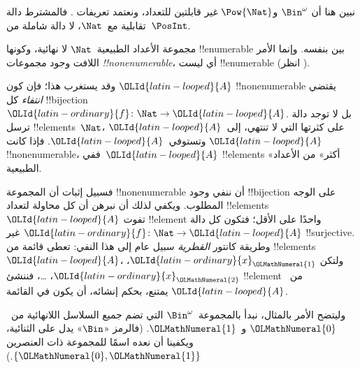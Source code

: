 \documentclass[../../../include/open-logic-section]{subfiles}
\begin{document}


\begin{editorial}
نبين هنا أن $\Bin^\omega$ و$\Pow{\Nat}$ غير قابلتين للتعداد، ونعتمد تعريفات . فالمشترط دالة تقابلية مع~$\Nat$، لا دالة شاملة من~$\PosInt$.
\end{editorial}

\begin{explain}
مجموعة الأعداد الطبيعية~$\Nat$ لا نهائية، وكونها !!{enumerable} بين بنفسه. وإنما الأمر اللافت وجود مجموعات \emph{!!{nonenumerable}}، أي ليست !!{enumerable} (انظر ).

وقد يستغرب هذا؛ فإن كون ${\OLId{latin-looped}{A}}$ !!{nonenumerable} يقتضي \emph{انتفاء} كل !!{bijection} ${\OLId{latin-ordinary}{f}}
\colon \Nat \to {\OLId{latin-looped}{A}}$. بل لا توجد دالة ترسل !!{element}s~$\Nat$، على كثرتها التي لا تنتهي، إلى~${\OLId{latin-looped}{A}}$ وتستوفي~${\OLId{latin-looped}{A}}$. فإذا كانت ${\OLId{latin-looped}{A}}$ !!{nonenumerable}، ففي~${\OLId{latin-looped}{A}}$ !!{element}s «أكثر» من الأعداد الطبيعية.

فسبيل إثبات أن المجموعة !!{nonenumerable} أن ننفي وجود !!{bijection} على الوجه المطلوب. ويكفي لذلك أن نبرهن أن كل محاولة لتعداد !!{element}s~${\OLId{latin-looped}{A}}$ تفوت !!{element} واحدًا على الأقل؛ فتكون كل دالة ${\OLId{latin-ordinary}{f}}\colon \Nat \to {\OLId{latin-looped}{A}}$ غير !!{surjective}. وطريقة كانتور \emph{القطرية} سبيل عام إلى هذا النفي: تعطى قائمة من !!{element}s~${\OLId{latin-looped}{A}}$، ولتكن ${\OLId{latin-ordinary}{x}}_{\OLMathNumeral{1}}$، ${\OLId{latin-ordinary}{x}}_{\OLMathNumeral{2}}$، \dots، فننشئ !!{element} من~${\OLId{latin-looped}{A}}$ يمتنع، بحكم إنشائه، أن يكون في القائمة.

وليتضح الأمر بالمثال، نبدأ بالمجموعة~$\Bin^\omega$ التي تضم جميع السلاسل اللانهائية من~${\OLMathNumeral{0}}$ و~${\OLMathNumeral{1}}$. (فالرمز «$\Bin$» يدل على الثنائية، ويكفينا أن نعده اسمًا للمجموعة ذات العنصرين $\{{\OLMathNumeral{0}},{\OLMathNumeral{1}}\}$.)
\end{explain}
\end{document}
